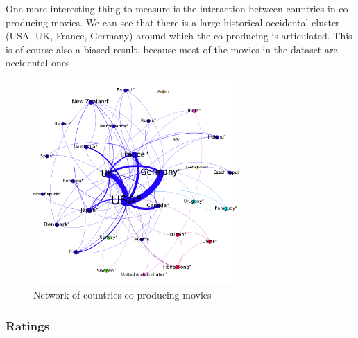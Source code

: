 One more interesting thing to measure is the interaction between countries in co-producing movies.
We can see that there is a large historical occidental cluster (USA, UK, France, Germany) around which the co-producing is articulated.
This is of course also a biased result, because most of the movies in the dataset are occidental ones.

\begin{figure}[!h]
\begin{center}
\includegraphics[width=0.7\textwidth]{../src/pre-processing/stats/results/CoocCountry.png}
\end{center}
\caption{Network of countries co-producing movies}
\label{fig:coocCountry}
\end{figure}

\subsubsection{Ratings}
\label{subs:Ratings}

